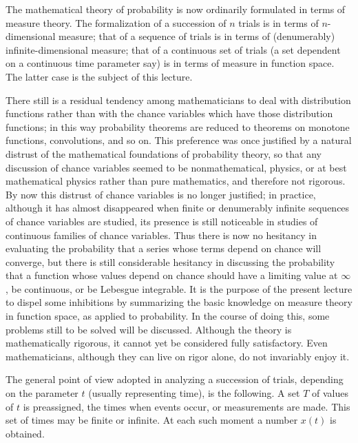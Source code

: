 \documentclass[11pt]{article}
\begin{document}
\setcounter{page}{15}
 The mathematical theory of probability is now ordinarily formulated in terms of measure theory. The formalization of a succession of $n$ trials is in terms of $n$-dimensional measure; that of a sequence of trials is in terms of (denumerably) infinite-dimensional measure; that of a continuous set of trials (a set dependent on a continuous time parameter say) is in terms of measure in function space. The latter case is the subject of this lecture.

There still is a residual tendency among mathematicians to deal with distribution functions rather than with the chance variables which have those distribution functions; in this way probability theorems are reduced to theorems on monotone functions, convolutions, and so on. This preference was once justified by a natural distrust of the mathematical foundations of probability theory, so that any discussion of chance variables seemed to be nonmathematical, physics, or at best mathematical physics rather than pure mathematics, and therefore not rigorous. By now this distrust of chance variables is no longer justified; in practice, although it has almost disappeared when finite or denumerably infinite sequences of chance variables are studied, its presence is still noticeable in studies of continuous families of chance variables. Thus there is now no hesitancy in evaluating the probability that a series whose terms depend on chance will converge, but there is still considerable hesitancy in discussing the probability that a function whose values depend on chance should have a limiting value at $\infty$, be continuous, or be Lebesgue integrable. It is the purpose of the present lecture to dispel some inhibitions by summarizing the basic knowledge on measure theory in function space, as applied to probability. In the course of doing this, some problems still to be solved will be discussed. Although the theory is mathematically rigorous, it cannot yet be considered fully satisfactory. Even mathematicians, although they can live on rigor alone, do not invariably enjoy it.

The general point of view adopted in analyzing a succession of trials, depending on the parameter $t$ (usually representing time), is the following. A set $T$ of values of $t$ is preassigned, the times when events occur, or measurements are made. This set of times may be finite or infinite. At each such moment a number $x(t)$ is obtained.
\end{document}
